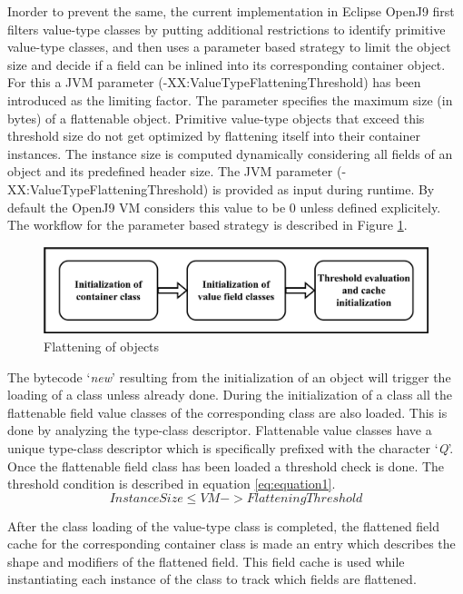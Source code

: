 \documentclass[12 pt, a4paper]{article}
\begin{document}
	Inorder to prevent the same, the current implementation in Eclipse OpenJ9 \citep{OpenJ9} first filters value-type classes
	 by 
putting additional restrictions to identify primitive value-type classes, and then uses a parameter based strategy to 
limit the object size and decide if a field can be inlined into its corresponding container object. 
For this a JVM parameter (-XX:ValueTypeFlatteningThreshold) has been introduced as the limiting
factor. 
The parameter  specifies the maximum size (in bytes) of a 
flattenable object. 
Primitive value-type objects \citep{JEPP} that exceed this threshold size do not get 
optimized by flattening itself into their container instances. 
The instance size is computed dynamically considering all fields of an object 
and its predefined header size. The JVM parameter (-XX:ValueTypeFlatteningThreshold) is provided as input during runtime. 
By default the OpenJ9 VM 
considers this value to be {0} unless defined explicitely.
The workflow for the parameter based strategy is described in Figure \ref{fig:Figure 2}.

\begin{figure}[h]
	\vskip 0.2cm
	\centering
	\includegraphics[scale=0.27]{Images/Class_Init.jpg}
	\caption{Flattening of objects}
	\label{fig:Figure 2}
\end{figure}



The bytecode `\textit{new}' resulting from the initialization of an object will trigger the loading 
of a class unless already done. 
During the initialization of a class all the flattenable field value classes of the 
corresponding class are also loaded. This is done by analyzing the type-class descriptor.
Flattenable value classes have a unique type-class descriptor which is specifically prefixed 
with the character `\textit{Q}'. 
Once the flattenable field class has been loaded a threshold check is done. The threshold 
condition is described in equation \ref{eq:equation1}.
\begin{equation}
	\label{eq:equation1}
	Instance Size \leq VM->Flattening Threshold
\end{equation} 

After the class loading of the value-type class is completed, the flattened field
cache for the corresponding container class is made an entry which describes the shape and modifiers 
of the flattened field. This field cache is used while instantiating
each instance of the class to track which fields are flattened. 
\clearpage
\end{document}
